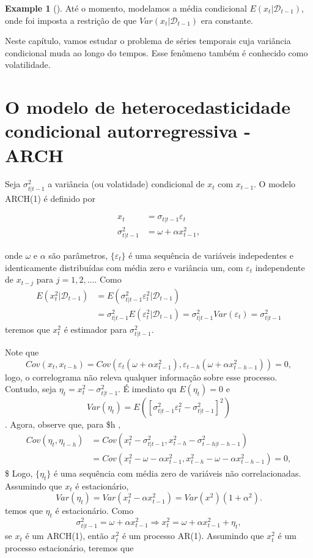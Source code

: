 \documentclass[
  letterpaper,
  DIV=11,
  numbers=noendperiod]{scrartcl}
\theoremstyle{definition}
\newtheorem{example}{Example}[chapter]
\theoremstyle{definition}
\theoremstyle{plain}
\theoremstyle{plain}
\theoremstyle{remark}
\begin{document}
\begin{example}[]
Até o momento, modelamos a média condicional
\(E(x_t|\mathcal{D}_{t-1})\), onde foi imposta a restrição de que
\(Var(x_t|\mathcal{D}_{t-1})\) era constante.

Neste capítulo, vamos estudar o problema de séries temporais cuja
variância condicional muda ao longo do tempos. Esse fenômeno também é
conhecido como volatilidade.

\section{O modelo de heterocedasticidade condicional autorregressiva -
ARCH}\label{o-modelo-de-heterocedasticidade-condicional-autorregressiva---arch}

Seja \(\sigma^2_{t|t-1}\) a variância (ou volatidade) condicional de
\(x_t\) com \(x_{t-1}\). O modelo ARCH(1) é definido por

\begin{align}x_t&=\sigma_{t|t-1}\varepsilon_t\\
\sigma^2_{t|t-1}&=\omega+\alpha x_{t-1}^2,\end{align}

onde \(\omega\) e \(\alpha\) são parâmetros, \(\{\varepsilon_t\}\) é uma
sequência de variáveis indepedentes e identicamente distribuídas com
média zero e variância um, com \(\varepsilon_t\) independente de
\(x_{t-j}\) para \(j=1,2,\ldots\). Como
\begin{align}E(x_t^2|\mathcal{D}_{t-1})&=E(\sigma^2_{t|t-1}\varepsilon_t^2|\mathcal{D}_{t-1})\\&=\sigma^2_{t|t-1}E(\varepsilon_t^2|\mathcal{D}_{t-1})=\sigma^2_{t|t-1}Var(\varepsilon_t)=\sigma^2_{t|t-1}\end{align}
teremos que \(x_t^2\) é estimador para \(\sigma^2_{t|t-1}\).

Note que
\[Cov(x_t,x_{t-h})=Cov(\varepsilon_t(\omega+\alpha x_{t-1}^2),\varepsilon_{t-h}(\omega+\alpha x_{t-h-1}^2))=0,\]
logo, o correlograma não releva qualquer informação sobre esse processo.
Contudo, seja \(\eta_t = x_t^2- \sigma^2_{t|t-1}\). É imediato qu
\(E(\eta_t)=0\) e
\[Var(\eta_t)=E([\sigma_{t|t-1}^2\varepsilon_t^2-\sigma^2_{t|t-1}]^2)\].
Agora, observe que, para \$h
\(,\)\begin{align}Cov(\eta_t,\eta_{t-h})&=Cov(x_{t}^2-\sigma^2_{t|t-1}, x_{t-h}^2-\sigma^2_{t-h|t-h-1})\\&=Cov(x_t^2-\omega-\alpha x_{t-1}^2,x_{t-h}^2 - \omega -\alpha x_{t-h-1}^2)=0,\end{align}\$
Logo, \(\{\eta_t\}\) é uma sequência com média zero de variáveis não
correlacionadas. Assumindo que \(x_t\) é estacionário,
\[Var(\eta_t)=Var(x_t^2 -\alpha x_{t-1}^2)=Var(x^2)(1+\alpha^2).\] temos
que \(\eta_t\) é estacionário. Como
\[\sigma^2_{t|t-1}=\omega + \alpha x_{t-1}^2\Rightarrow x_t^2=\omega+\alpha x_{t-1}^2+\eta_t,\]
se \(x_t\) é um ARCH(1), então \(x_t^2\) é um processo AR(1). Assumindo
que \(x_t^2\) é um processo estacionário, teremos que


\end{example}
\end{document}
